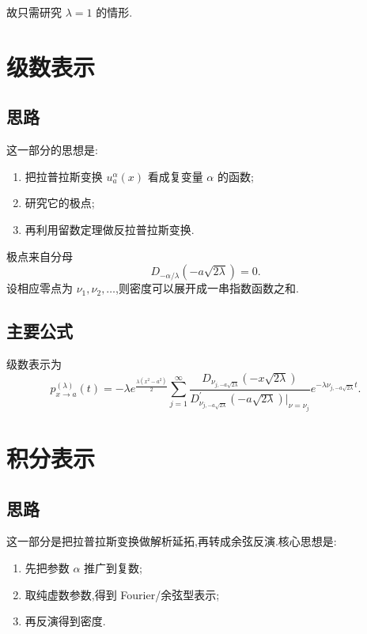 \documentclass[oneside]{ctexart}
\begin{document}
故只需研究 $\lambda=1$ 的情形.

\section{级数表示}

\subsection{思路}

这一部分的思想是:

\begin{enumerate}[(1)]
    \item 把拉普拉斯变换 $u_{a}^{\alpha}(x)$ 看成复变量 $\alpha$ 的函数;
    \item 研究它的极点;
    \item 再利用留数定理做反拉普拉斯变换.
\end{enumerate}

极点来自分母
\[
    D_{-\alpha/\lambda}(-a\sqrt{2\lambda})=0.
\]
设相应零点为 $\nu_1,\nu_2,\dots$,则密度可以展开成一串指数函数之和.

\subsection{主要公式}

级数表示为
\begin{equation}\label{eq:series}
    p_{x\to a}^{(\lambda)}(t)
    =
    -\lambda e^{\tfrac{\lambda(x^2-a^2)}{2}}
    \sum_{j=1}^{\infty}
    \frac{D_{\nu_{j,-a\sqrt{2\lambda}}}(-x\sqrt{2\lambda})}
    { D^{'}_{\nu_{j,-a\sqrt{2\lambda}}}(-a\sqrt{2\lambda})|_{\nu=\nu_j}}
    e^{-\lambda \nu_{j,-a\sqrt{2\lambda} }t}.
\end{equation}


\section{积分表示}

\subsection{思路}

这一部分是把拉普拉斯变换做解析延拓,再转成余弦反演.核心思想是:

\begin{enumerate}[(1)]
    \item 先把参数 $\alpha$ 推广到复数;
    \item 取纯虚数参数,得到 Fourier/余弦型表示;
    \item 再反演得到密度.
\end{enumerate}
\end{document}
